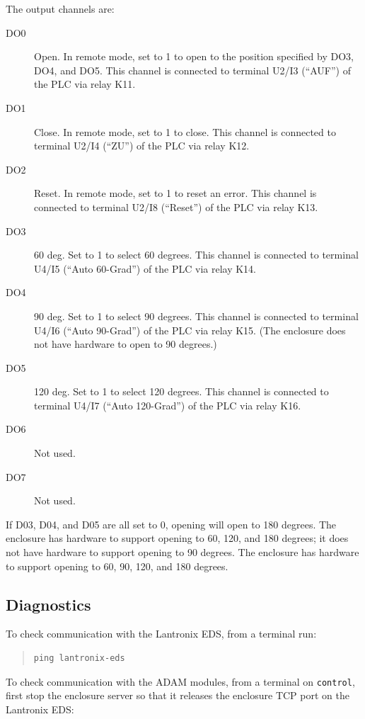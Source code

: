 The output channels are:
\begin{description}
\item[DO0] Open. In remote mode, set to 1 to open to the position specified by DO3, DO4, and DO5. This channel is connected to terminal U2/I3 (“AUF”) of the PLC via relay K11.
\item[DO1] Close. In remote mode, set to 1 to close. This channel is connected to terminal U2/I4 (“ZU”) of the PLC via relay K12.
\item[DO2] Reset. In remote mode, set to 1 to reset an error. This channel is connected to terminal U2/I8 (“Reset”) of the PLC via relay K13.
\item[DO3] 60 deg. Set to 1 to select 60 degrees. This channel is connected to terminal U4/I5 (“Auto 60-Grad”) of the PLC via relay K14.
\item[DO4] 90 deg. Set to 1 to select 90 degrees. This channel is connected to terminal U4/I6 (“Auto 90-Grad”) of the PLC via relay K15. 
\ifcoatli
(The {\projectname} enclosure does not have hardware to open to 90 degrees.)
\fi
\item[DO5] 120 deg. Set to 1 to select 120 degrees. This channel is connected to terminal U4/I7 (“Auto 120-Grad”) of the PLC via relay K16.
\item[DO6] Not used.
\item[DO7] Not used.
\end{description}

If D03, D04, and D05 are all set to 0, opening will open to 180 degrees. 
\ifcoatli
The {\projectname} enclosure has hardware to support opening to 60, 120, and 180 degrees; it does not have hardware to support opening to 90 degrees. 
\fi
\ifddoti
The {\projectname} enclosure has hardware to support opening to 60, 90, 120, and 180 degrees.
\fi

\subsection{Diagnostics}

To check communication with the Lantronix EDS, from a terminal run:

\begin{quotation}
\begin{verbatim}
ping lantronix-eds
\end{verbatim}
\end{quotation}

To check communication with the ADAM modules, from a terminal on \verb|control|, first stop the enclosure server so that it releases the enclosure TCP port on the Lantronix EDS:

